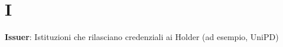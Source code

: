 \section{I}
\textbf{Issuer}: Istituzioni che rilasciano credenziali ai Holder (ad esempio, UniPD)\\
